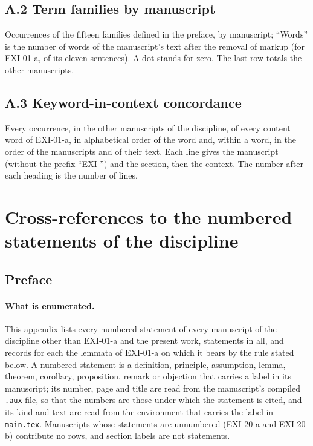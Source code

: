{\scriptsize}

\subsection*{A.2 Term families by manuscript}

{\footnotesize Occurrences of the fifteen families defined in the preface, by manuscript; \enquote{Words} is the number of words of the manuscript's text after the removal of markup (for EXI-01-a, of its eleven sentences). A dot stands for zero. The last row totals the other manuscripts.\par}

{\footnotesize}

{\footnotesize}

\subsection*{A.3 Keyword-in-context concordance}

{\footnotesize Every occurrence, in the other manuscripts of the discipline, of every content word of EXI-01-a, in alphabetical order of the word and, within a word, in the order of the manuscripts and of their text. Each line gives the manuscript (without the prefix \enquote{EXI-}) and the section, then the context. The number after each heading is the number of lines.\par}

{\scriptsize}

\section{Cross-references to the numbered statements of the discipline}\label{app:xref}

\subsection*{Preface}

\paragraph{What is enumerated.} This appendix lists every numbered statement of every manuscript of the discipline other than EXI-01-a and the present work, \cnStatements{} statements in all, and records for each the lemmata of EXI-01-a on which it bears by the rule stated below. A numbered statement is a definition, principle, assumption, lemma, theorem, corollary, proposition, remark or objection that carries a label in its manuscript; its number, page and title are read from the manuscript's compiled \texttt{.aux} file, so that the numbers are those under which the statement is cited, and its kind and text are read from the environment that carries the label in \texttt{main.tex}. Manuscripts whose statements are unnumbered (EXI-20-a and EXI-20-b) contribute no rows, and section labels are not statements.

